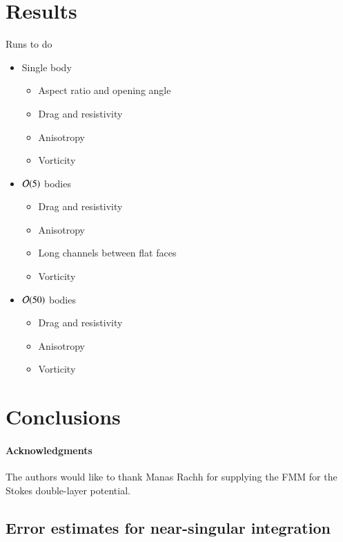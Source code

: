 \documentclass[preprint, 10pt]{elsarticle}
\begin{document}



\section{Results\label{s:results}} 

Runs to do
\begin{itemize}
  \item Single body
  \begin{itemize}
    \item Aspect ratio and opening angle
    \item Drag and resistivity
    \item Anisotropy
    \item Vorticity
  \end{itemize}
  \item ${\mathcal{O}}(5)$ bodies
  \begin{itemize}
    \item Drag and resistivity
    \item Anisotropy
    \item Long channels between flat faces
    \item Vorticity
  \end{itemize}
  \item ${\mathcal{O}}(50)$ bodies
  \begin{itemize}
    \item Drag and resistivity
    \item Anisotropy
    \item Vorticity
  \end{itemize}
\end{itemize}


\section{Conclusions\label{s:conclusions}}


\paragraph{\bf Acknowledgments} The authors would like to thank Manas Rachh
for supplying the FMM for the Stokes double-layer potential.


\begin{appendices}
\section{Error estimates for near-singular integration \label{A:AppendixA}} 
\end{appendices}


 

\end{document}
